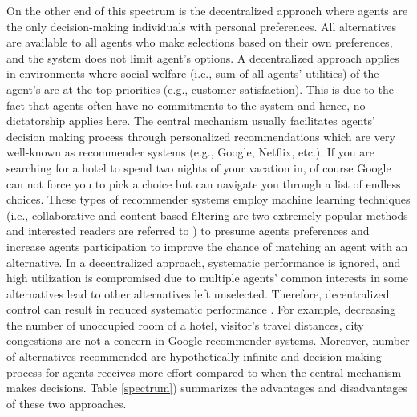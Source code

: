 \documentclass[11pt, letterpaper]{article}
\begin{document}
On the other end of this spectrum is the decentralized approach where agents are the only decision-making individuals with personal preferences. All alternatives are available to all agents who make selections based on their own preferences, and the system does not limit agent's options.  
A decentralized approach applies in environments where social welfare (i.e., sum of all agents' utilities) of the agent's are at the top priorities (e.g., customer satisfaction). This is due to the fact that agents often have no commitments to the system and hence, no dictatorship applies here. The central mechanism usually facilitates agents' decision making process through  personalized recommendations which are very well-known as recommender systems (e.g., Google, Netflix, etc.). If you are searching for a hotel to spend two nights of your vacation in, of course Google can not force you to pick a choice but can navigate you through a list of endless choices. These types of recommender systems employ machine learning techniques (i.e., collaborative and content-based filtering are two extremely popular methods and interested readers are referred to \cite{resnick1997recommender}) to presume agents preferences and increase agents participation to improve the chance of matching an agent with an alternative. In a decentralized approach, systematic performance is ignored, and high utilization is compromised due to multiple agents' common interests in some alternatives lead to other alternatives left unselected. Therefore, decentralized control can result in reduced systematic performance \cite{roughgarden2005selfish}. For example, decreasing the number of unoccupied room of a hotel, visitor's travel distances, city congestions are not a concern in Google recommender systems. Moreover, number of alternatives recommended are hypothetically infinite and decision making process for agents receives more effort compared to when the central mechanism makes decisions. Table \ref{spectrum}) summarizes the advantages and disadvantages of these two approaches.
\end{document}
